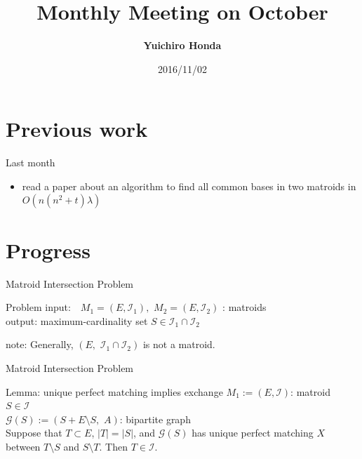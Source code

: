\documentclass[11pt,xcolor=dvipsnames,table,dvipdfmx]{beamer}
\title{Monthly Meeting on October}
\author{\textbf{Yuichiro Honda}}
\date{2016/11/02}
\institute{Morita lab. M1}
\begin{document}
\maketitle

\section{Previous work}
\begin{frame}{Last month}
 \begin{itemize}
  \item read a paper about an algorithm to find all common bases in two matroids in $O(n(n^2+t)\lambda)$
 \end{itemize}
\end{frame}

\section{Progress}
\begin{frame}{Matroid Intersection Problem}
 \begin{block}{Problem}
  input: \,\, $M_1 = (E, \mathcal{I}_1),\,\,M_2 = (E, \mathcal{I}_2)$ : matroids\\
  output: maximum-cardinality set $S \in \mathcal{I}_1 \cap \mathcal{I}_2$
 \end{block}
 note: Generally, $(E,\,\,\mathcal{I}_1 \cap \mathcal{I}_2)$ is not a matroid.
\end{frame}

\begin{frame}{Matroid Intersection Problem}
 \begin{block}{Lemma: unique perfect matching implies exchange}
  $M_1 := (E, \mathcal{I})$: matroid\\
  $S \in \mathcal{I}$\\
  $\mathcal{G}(S) := (S+E\setminus S,\,\,A)$: bipartite graph\\
  Suppose that $T \subset E$,\,\,$|T|=|S|$, and $\mathcal{G}(S)$ has unique perfect matching $X$ between $T \setminus S$ and $S \setminus T$. Then $T \in \mathcal{I}$.
 \end{block}
\end{frame}
\end{document}
